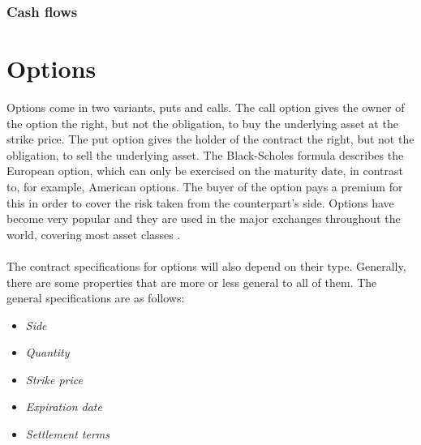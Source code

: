 \documentclass[11pt,a4paper]{article}
\numberwithin{equation}{section}
\begin{document}
	\subsubsection{Cash flows}

\section{Options}
Options come in two variants, puts and calls. The call option gives the owner of the
option the right, but not the obligation, to buy the underlying asset at the strike price.
The put option gives the holder of the contract the right, but not the obligation, to sell
the underlying asset. The Black-Scholes formula describes the European option,
which can only be exercised on the maturity date, in contrast to, for example,
American options. The buyer of the option pays a premium for this in order to cover
the risk taken from the counterpart's side. Options have become very popular and they
are used in the major exchanges throughout the world, covering most asset classes \cite{astborg:fsharp}.
\\\\
The contract specifications for options will also depend on their type.
Generally, there are some properties that are more or less general to all of them.
The general specifications are as follows:

\begin{itemize}
\item \emph{Side}
\item \emph{Quantity}
\item \emph{Strike price}
\item \emph{Expiration date}
\item \emph{Settlement terms}
\end{itemize}
\end{document}
